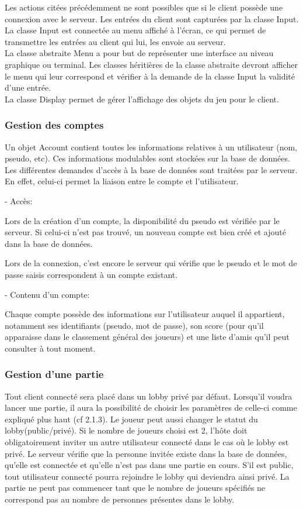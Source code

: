 \documentclass[a4paper,12pt]{article}
\begin{document}
Les actions citées précédemment ne sont possibles que si le client possède une connexion avec le serveur. Les entrées du client sont capturées par la classe Input.\\
La classe Input est connectée au menu affiché à l'écran, ce qui permet de transmettre les entrées au client qui lui, les envoie au serveur.\\
La classe abstraite Menu a pour but de représenter une interface au niveau graphique ou terminal. Les classes héritières de la classe abstraite devront afficher le menu qui leur correspond et vérifier à la demande de la classe Input la validité d'une entrée.\\
La classe Display permet de gérer l'affichage des objets du jeu pour le client.


\subsubsection{Gestion des comptes}
Un objet Account contient toutes les informations relatives à un utilisateur (nom, pseudo, etc). Ces informations modulables sont stockées sur la base de données.
 Les différentes demandes d'accès à la base de données sont traitées par le serveur. En effet, celui-ci permet la liaison entre le compte et l'utilisateur.

- Accès:

Lors de la création d'un compte, la disponibilité du pseudo est vérifiée par le serveur. Si celui-ci n'est pas trouvé, un nouveau compte est bien créé et ajouté dans la base de données.

Lors de la connexion, c'est encore le serveur qui vérifie que le pseudo et le mot de passe saisis correspondent à un compte existant.

- Contenu d'un compte:

Chaque compte possède des informations sur l'utilisateur auquel il appartient, notamment ses identifiants (pseudo, mot de passe), son score (pour qu'il apparaisse dans le classement général des joueurs) et une liste d'amis qu'il peut consulter à tout moment.

\subsubsection{Gestion d'une partie}

Tout client connecté sera placé dans un lobby privé par défaut. Lorsqu'il voudra lancer une partie,
il aura la possibilité de choisir les paramètres de celle-ci comme expliqué plus haut (cf 2.1.3). Le joueur peut aussi changer le statut du lobby(public/privé). Si le nombre de joueurs choisi est 2, l'hôte doit obligatoirement inviter un autre utilisateur connecté dans le cas où le lobby est privé.
Le serveur vérifie que la personne invitée existe dans la base de données, qu'elle est connectée et qu'elle n'est pas dans une partie en cours.
S'il est public, tout utilisateur connecté pourra rejoindre le lobby qui deviendra ainsi privé.
La partie ne peut pas commencer tant que le nombre de joueurs spécifiés ne correspond pas au nombre de personnes présentes dans le lobby.
\end{document}
